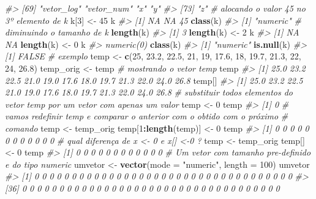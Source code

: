 \documentclass[]{book}
\newenvironment{Shaded}{\begin{snugshade}}{\end{snugshade}}
\newcommand{\KeywordTok}[1]{\textcolor[rgb]{0.13,0.29,0.53}{\textbf{#1}}}
\newcommand{\DataTypeTok}[1]{\textcolor[rgb]{0.13,0.29,0.53}{#1}}
\newcommand{\DecValTok}[1]{\textcolor[rgb]{0.00,0.00,0.81}{#1}}
\newcommand{\FloatTok}[1]{\textcolor[rgb]{0.00,0.00,0.81}{#1}}
\newcommand{\StringTok}[1]{\textcolor[rgb]{0.31,0.60,0.02}{#1}}
\newcommand{\CommentTok}[1]{\textcolor[rgb]{0.56,0.35,0.01}{\textit{#1}}}
\newcommand{\OperatorTok}[1]{\textcolor[rgb]{0.81,0.36,0.00}{\textbf{#1}}}
\newcommand{\NormalTok}[1]{#1}
\begin{document}
\begin{Shaded}
\begin{Highlighting}[]
\CommentTok{#> [69] "vetor_log"     "vetor_num"     "x"             "y"            }
\CommentTok{#> [73] "z"}
\CommentTok{# alocando o valor 45 no 3º elemento de k}
\NormalTok{k[}\DecValTok{3}\NormalTok{] <-}\StringTok{ }\DecValTok{45}
\NormalTok{k}
\CommentTok{#> [1] NA NA 45}
\KeywordTok{class}\NormalTok{(k)}
\CommentTok{#> [1] "numeric"}
\CommentTok{# diminuindo o tamanho de k}
\KeywordTok{length}\NormalTok{(k)}
\CommentTok{#> [1] 3}
\KeywordTok{length}\NormalTok{(k) <-}\StringTok{ }\DecValTok{2}
\NormalTok{k}
\CommentTok{#> [1] NA NA}
\KeywordTok{length}\NormalTok{(k) <-}\StringTok{ }\DecValTok{0}
\NormalTok{k}
\CommentTok{#> numeric(0)}
\KeywordTok{class}\NormalTok{(k)}
\CommentTok{#> [1] "numeric"}
\KeywordTok{is.null}\NormalTok{(k)}
\CommentTok{#> [1] FALSE}
\CommentTok{# exemplo}
\NormalTok{temp <-}\StringTok{ }\KeywordTok{c}\NormalTok{(}\DecValTok{25}\NormalTok{, }\FloatTok{23.2}\NormalTok{, }\FloatTok{22.5}\NormalTok{, }\DecValTok{21}\NormalTok{, }\DecValTok{19}\NormalTok{, }\FloatTok{17.6}\NormalTok{, }\DecValTok{18}\NormalTok{, }\FloatTok{19.7}\NormalTok{, }\FloatTok{21.3}\NormalTok{, }\DecValTok{22}\NormalTok{, }\DecValTok{24}\NormalTok{, }\FloatTok{26.8}\NormalTok{)}
\NormalTok{temp_orig <-}\StringTok{ }\NormalTok{temp}
\CommentTok{# mostrando o vetor temp}
\NormalTok{temp}
\CommentTok{#>  [1] 25.0 23.2 22.5 21.0 19.0 17.6 18.0 19.7 21.3 22.0 24.0 26.8}
\NormalTok{temp[]}
\CommentTok{#>  [1] 25.0 23.2 22.5 21.0 19.0 17.6 18.0 19.7 21.3 22.0 24.0 26.8}
\CommentTok{# substituir todos elementos do vetor temp por um vetor com apenas um valor}
\NormalTok{temp <-}\StringTok{ }\DecValTok{0}
\NormalTok{temp}
\CommentTok{#> [1] 0}
\CommentTok{# vamos redefinir temp e comparar o anterior com o obtido com o próximo}
\CommentTok{# comando}
\NormalTok{temp <-}\StringTok{ }\NormalTok{temp_orig}
\NormalTok{temp[}\DecValTok{1}\OperatorTok{:}\KeywordTok{length}\NormalTok{(temp)] <-}\StringTok{ }\DecValTok{0}
\NormalTok{temp}
\CommentTok{#>  [1] 0 0 0 0 0 0 0 0 0 0 0 0}
\CommentTok{# qual diferença de x <- 0 e x[] <-0 ?}
\NormalTok{temp <-}\StringTok{ }\NormalTok{temp_orig}
\NormalTok{temp[] <-}\StringTok{ }\DecValTok{0}
\NormalTok{temp}
\CommentTok{#>  [1] 0 0 0 0 0 0 0 0 0 0 0 0}
\CommentTok{# Um vetor com tamanho pre-definido e do tipo numeric}
\NormalTok{umvetor <-}\StringTok{ }\KeywordTok{vector}\NormalTok{(}\DataTypeTok{mode =} \StringTok{"numeric"}\NormalTok{, }\DataTypeTok{length =} \DecValTok{100}\NormalTok{)}
\NormalTok{umvetor}
\CommentTok{#>   [1] 0 0 0 0 0 0 0 0 0 0 0 0 0 0 0 0 0 0 0 0 0 0 0 0 0 0 0 0 0 0 0 0 0 0 0}
\CommentTok{#>  [36] 0 0 0 0 0 0 0 0 0 0 0 0 0 0 0 0 0 0 0 0 0 0 0 0 0 0 0 0 0 0 0 0 0 0 0}

\end{Highlighting}
\end{Shaded}
\end{document}
